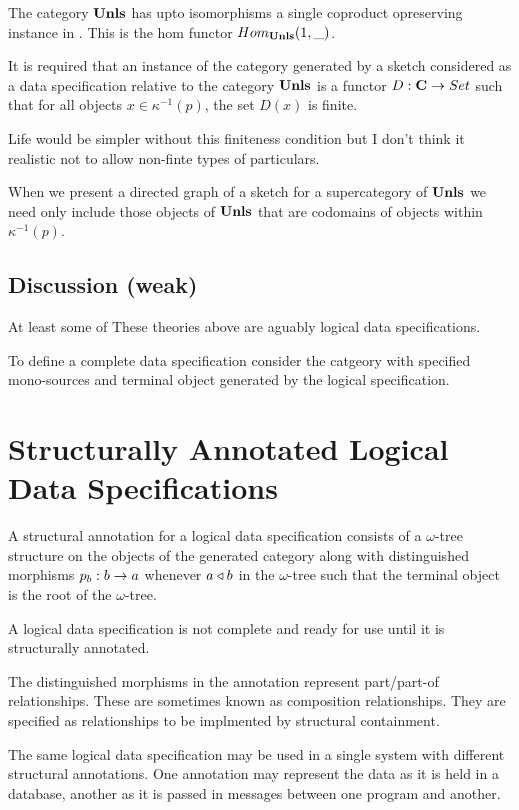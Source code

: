 \documentclass[10pt,a4paper]{article}
\theoremstyle{remark}
\begin{document}
The category $\textbf{Unls}$ has upto isomorphisms a single coproduct opreserving instance in \Set. 
This is the hom functor $Hom_{\textbf{Unls}}(1,\_)$.

It is required that an instance of the category \catcw  generated by a sketch considered as a data specification relative to  the category $\textbf{Unls}$ is a functor $D: \textbf{C} \rightarrow Set$ such
that for all objects $x \in \kappa^{-1}(p)$, the set $D(x)$ is finite.

Life would be simpler without this finiteness condition but I don't think it realistic not to allow non-finte types of particulars.

When we present a directed graph of a sketch for a supercategory of $\textbf{Unls}$ we need only include those
objects of $\textbf{Unls}$ that are codomains of objects within  $\kappa^{-1}(p)$.

\begin{oldtt}
\subsection*{Discussion (weak)}
At least some of These theories above are aguably logical data specifications.

To define a complete data specification consider the catgeory with specified mono-sources
and terminal object generated by the logical specification. 
\end{oldtt}

\section{Structurally Annotated Logical Data Specifications}
A structural annotation for a logical data specification consists of a 
$\omega$-tree structure on the objects of the generated category \catcw
along with distinguished morphisms $p_b: b \rightarrow a$ whenever $a \triangleleft b$ in the  $\omega$-tree
such that the terminal object is the root of the $\omega$-tree.

A logical data specification is not complete and ready for use until it is structurally annotated.

The distinguished morphisms in the annotation represent part/part-of relationships. These are sometimes known as composition relationships. They are specified as relationships to be implmented by structural containment.

The same logical data specification may be used in a single system with different structural annotations.
One annotation may represent the data as it is held in a database, another as it is passed in messages between one program and another.
\end{document}
